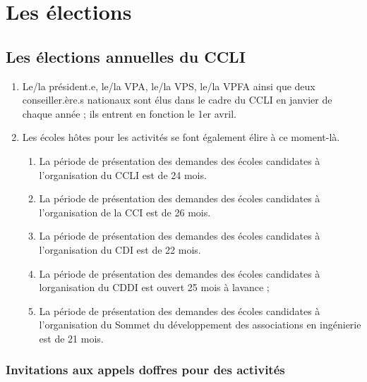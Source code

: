 \section{Les élections}
\label{les-elections}

\subsection{Les élections annuelles du CCLI}
\label{les-elections-annuelles-du-ccli}

\begin{enumerate}
 \item
  Le/la président.e, le/la VPA, le/la VPS, le/la VPFA ainsi que deux conseiller.ère.s nationaux sont élus dans le cadre du CCLI en janvier de chaque année ; ils entrent en fonction le 1er avril.
 \item
  Les écoles hôtes pour les activités se font également élire à ce moment-là.

  \begin{enumerate}
   \item
    La période de présentation des demandes des écoles candidates à l'organisation du CCLI est de 24 mois.
   \item
    La période de présentation des demandes des écoles candidates à l'organisation de la CCI est de 26 mois.
   \item
    La période de présentation des demandes des écoles candidates à l'organisation du CDI est de 22 mois.
   \item
    La période de présentation des demandes des écoles candidates à l\textquotesingle organisation du CDDI est ouvert 25 mois à l\textquotesingle avance ;
   \item
    La période de présentation des demandes des écoles candidates à l'organisation du Sommet du développement des associations en ingénierie est de 21 mois.
  \end{enumerate}
\end{enumerate}

\subsubsection{Invitations aux appels d\textquotesingle offres pour des activités}
\label{invitations-aux-appels-d-offres-pour-des-activites}


